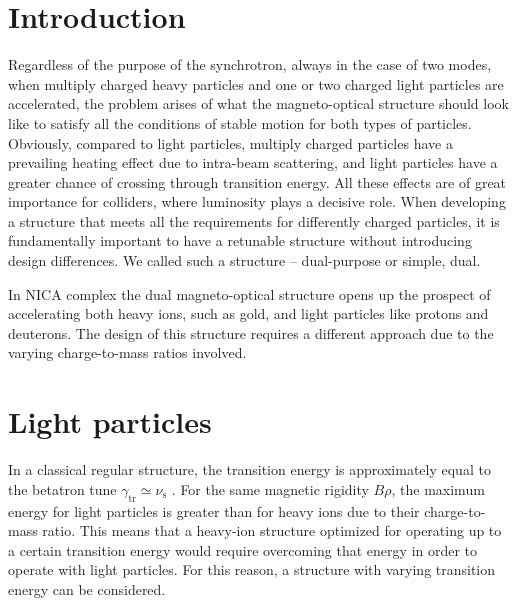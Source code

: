 \documentclass[submitting]{nst}
\begin{document}
\section{Introduction}\label{sec.I}
\par Regardless of the purpose of the synchrotron, always in the case of two modes, when multiply charged heavy particles and one or two charged light particles are accelerated, the problem arises of what the magneto-optical structure should look like to satisfy all the conditions of stable motion for both types of particles. Obviously, compared to light particles, multiply charged particles have a prevailing heating effect due to intra-beam scattering, and light particles have a greater chance of crossing through transition energy. All these effects are of great importance for colliders, where luminosity plays a decisive role. When developing a structure that meets all the requirements for differently charged particles, it is fundamentally important to have a retunable structure without introducing design differences. We called such a structure -- dual-purpose or simple, dual.
\par In NICA complex the dual magneto-optical structure opens up the prospect of accelerating both heavy ions, such as gold, and light particles like protons and deuterons. The design of this structure requires a different approach due to the varying charge-to-mass ratios involved.
\section{Light particles}\label{sec.II}
In a classical regular structure, the transition energy is approximately equal to the betatron tune $\gamma_{\text{tr}}\simeq\nu_{\text{s}}$ \cite{b1}. For the same magnetic rigidity $B\rho$, the maximum energy for light particles is greater than for heavy ions due to their charge-to-mass ratio. This means that a heavy-ion structure optimized for operating up to a certain transition energy would require overcoming that energy in order to operate with light particles. For this reason, a structure with varying transition energy can be considered.
\end{document}
